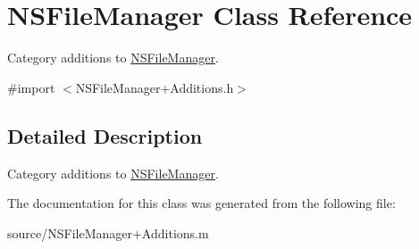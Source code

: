 \hypertarget{class_n_s_file_manager}{
\section{NSFileManager Class Reference}
\label{class_n_s_file_manager}
}


Category additions to \hyperlink{class_n_s_file_manager}{NSFileManager}.  


{\ttfamily \#import $<$NSFileManager+Additions.h$>$}

\subsection{Detailed Description}
Category additions to \hyperlink{class_n_s_file_manager}{NSFileManager}. 

The documentation for this class was generated from the following file:\begin{DoxyCompactItemize}
\item 
source/NSFileManager+Additions.m\end{DoxyCompactItemize}
